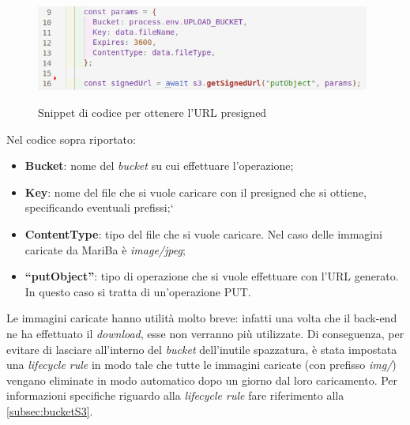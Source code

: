 	\begin{figure}[H]
		\centering
		\includegraphics[width=11cm]{immagini/getURL.png} \\
		\caption{\label{fig:getURL} Snippet di codice per ottenere l'URL presigned}
	\end{figure}
	
	Nel codice sopra riportato:
	\begin{itemize}
		\item \textbf{Bucket}: nome del \emph{bucket} su cui effettuare l'operazione;
		\item \textbf{Key}: nome del file che si vuole caricare con il presigned che si ottiene, specificando eventuali prefissi;`
		\item \textbf{ContentType}: tipo del file che si vuole caricare. Nel caso delle immagini caricate da MariBa è \emph{image/jpeg};
		\item \textbf{``putObject''}: tipo di operazione che si vuole effettuare con l'URL generato. In questo caso si 
		tratta di un'operazione PUT.
	\end{itemize}
	Le immagini caricate hanno utilità molto breve: infatti una volta che il back-end ne ha effettuato il \emph{download}, 
	esse non verranno più utilizzate. Di conseguenza, per evitare di lasciare all'interno del \emph{bucket} dell'inutile spazzatura, è stata impostata una \emph{lifecycle rule} in modo tale che tutte le immagini caricate (con prefisso \emph{img/}) vengano eliminate in modo automatico dopo un giorno dal loro caricamento.
	Per informazioni specifiche riguardo alla \emph{lifecycle rule} fare riferimento alla \autoref{subsec:bucketS3}.
	
